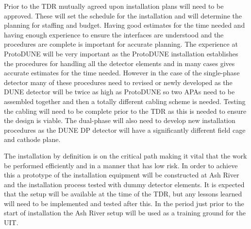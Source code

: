 Prior to the TDR mutually agreed upon installation plans will need to
be approved. These will set the schedule for the installation and will
determine the planning for staffing and budget. Having good estimates
for the time needed and having enough experience to ensure the
interfaces are understood and the procedures are complete is important
for accurate planning. The experience at ProtoDUNE will be very
important as the ProtoDUNE installation establishes the procedures for
handling all the detector elements and in many cases gives accurate
estimates for the time needed. However in the case of the single-phase
detector many of these procedures need to revised or newly developed
as the DUNE detector will be twice as high as ProtoDUNE so two APAs
need to be assembled together and then a totally different cabling scheme is
needed. Testing the cabling will need to be complete prior to the TDR
as this is needed to ensure the design is viable. The dual-phase will
also need to develop new installation procedures as the DUNE DP
detector will have a significantly different field cage and cathode
plane.

The installation by definition is on the critical path making it vital
that the work be performed efficiently and in a manner that has low
risk. In order to achieve this a prototype of the installation
equipment will be constructed at Ash River and the installation
process tested with dummy detector elements. It is expected that the
setup will be available at the time of the TDR, but any lessons
learned will need to be implemented and tested after this. In the
period just prior to the start of installation the Ash River setup
will be used as a training ground for the UIT.



